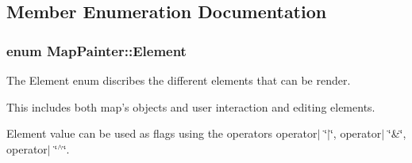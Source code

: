 \subsection{\-Member \-Enumeration \-Documentation}
\hypertarget{class_map_painter_a771b3fa246b6c13cc2acbdcf1cb6eee3}{
\subsubsection[{\-Element}]{\setlength{\rightskip}{0pt plus 5cm}enum {\bf \-Map\-Painter\-::\-Element}}}\label{class_map_painter_a771b3fa246b6c13cc2acbdcf1cb6eee3}


\-The \-Element enum discribes the different elements that can be render. 

\-This includes both map's objects and user interaction and editing elements.

\-Element value can be used as flags using the operators operator$|$ \char`\"{}$|$\char`\"{}, operator$|$ \char`\"{}\&\char`\"{}, operator$|$ \char`\"{}$^\wedge$\char`\"{}.

